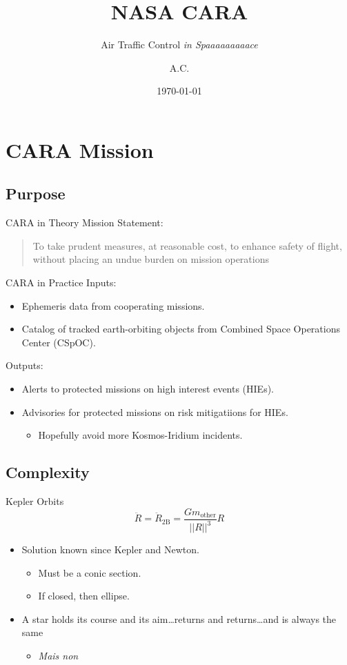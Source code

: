\documentclass[pdf]{beamer}
\title{NASA CARA}
\subtitle{Air Traffic Control \emph{in Spaaaaaaaaace}}
\author{A.C.}
\date{\today}
\begin{document}
\begin{frame}
  \titlepage
\end{frame}

\section{CARA Mission}
\subsection{Purpose}
\begin{frame}{CARA in Theory}
  Mission Statement:
  \begin{quote}
    To take prudent measures, at reasonable cost, to enhance safety of flight,
    without placing an undue burden on mission operations
  \end{quote}
\end{frame}

\begin{frame}{CARA in Practice}
  Inputs:
  \begin{itemize}
  \item Ephemeris data from cooperating missions.
  \item Catalog of tracked earth-orbiting objects from Combined Space Operations
    Center (CSpOC).
  \end{itemize}

  Outputs:
  \begin{itemize}
  \item Alerts to protected missions on high interest events (HIEs).
  \item Advisories for protected missions on risk mitigatiions for HIEs.
    \begin{itemize}
    \item Hopefully avoid more Kosmos-Iridium incidents.
    \end{itemize}
  \end{itemize}
\end{frame}

\subsection{Complexity}
\begin{frame}{Kepler Orbits}
  \[ \ddot{R} = \ddot{R}_\text{2B} = \frac{Gm_\text{other}}{||R||^3}R \]

  \begin{itemize}
  \item Solution known since Kepler and Newton.
    \begin{itemize}
    \item Must be a conic section.
    \item If closed, then ellipse.
    \end{itemize}
  \item A star holds its course and its aim\ldots returns and returns\ldots and is always the same
    \begin{itemize}
    \item \textit{Mais non}
    \end{itemize}
  \end{itemize}
\end{frame}
\end{document}

